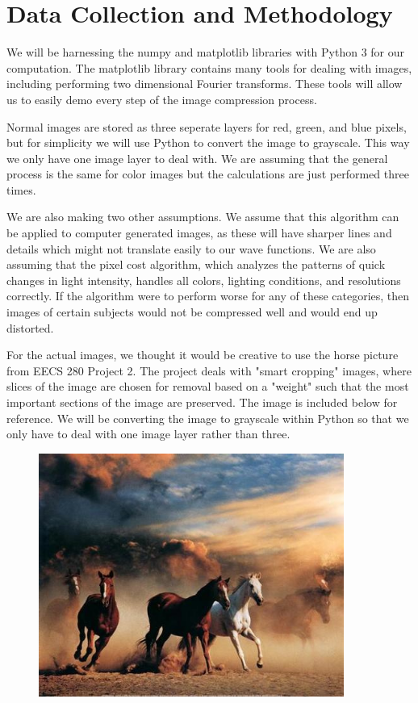 \documentclass[12pt]{article}
\begin{document}
\section{Data Collection and Methodology}

We will be harnessing the numpy and matplotlib libraries with Python 3 for our computation. The matplotlib library contains many tools for dealing with images, including performing two dimensional Fourier transforms. These tools will allow us to easily demo every step of the image compression process.

Normal images are stored as three seperate layers for red, green, and blue pixels, but for simplicity we will use Python to convert the image to grayscale. This way we only have one image layer to deal with. We are assuming that the general process is the same for color images but the calculations are just performed three times.

We are also making two other assumptions. We assume that this algorithm can be applied to computer generated images, as these will have sharper lines and details which might not translate easily to our wave functions. We are also assuming that the pixel cost algorithm, which analyzes the patterns of quick changes in light intensity, handles all colors, lighting conditions, and resolutions correctly. If the algorithm were to perform worse for any of these categories, then images of certain subjects would not be compressed well and would end up distorted.

For the actual images, we thought it would be creative to use the horse picture from EECS 280 Project 2. The project deals with "smart cropping" images, where slices of the image are chosen for removal based on a "weight" such that the most important sections of the image are preserved. The image is included below for reference. We will be converting the image to grayscale within Python so that we only have to deal with one image layer rather than three.

\begin{figure}[ht]
	\centering
	\includegraphics[width=10cm]{horses.png}
\end{figure}
\end{document}
